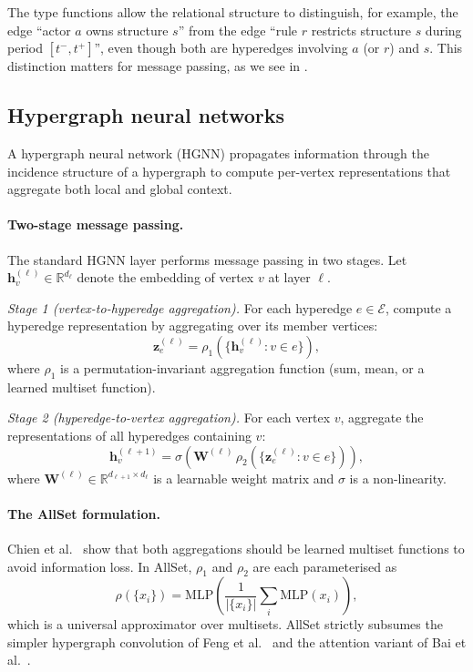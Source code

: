 \documentclass[11pt,a4paper]{article}
\theoremstyle{plain}
\theoremstyle{definition}
\theoremstyle{remark}
\newcommand{\hvec}{\mathbf{h}}
\begin{document}
The type functions allow the relational structure to distinguish, for
example, the edge ``actor $a$ owns structure $s$'' from the edge
``rule $r$ restricts structure $s$ during period $[t^-, t^+]$'',
even though both are hyperedges involving $a$ (or $r$) and $s$.
This distinction matters for message passing, as we see in
.

\subsection{Hypergraph neural networks}
\label{sec:prelim_hgnn}

A hypergraph neural network (HGNN) propagates information through
the incidence structure of a hypergraph to compute per-vertex
representations that aggregate both local and global context.

\paragraph{Two-stage message passing.}
The standard HGNN layer performs message passing in two stages.
Let $\hvec_v^{(\ell)} \in \mathbb{R}^{d_\ell}$ denote the embedding
of vertex $v$ at layer $\ell$.

\textit{Stage 1 (vertex-to-hyperedge aggregation).}
For each hyperedge $e \in \mathcal{E}$, compute a hyperedge
representation by aggregating over its member vertices:
\[
  \mathbf{z}_e^{(\ell)}
  = \rho_1\!\left(\bigl\{\hvec_v^{(\ell)} : v \in e\bigr\}\right),
\]
where $\rho_1$ is a permutation-invariant aggregation function (sum,
mean, or a learned multiset function).

\textit{Stage 2 (hyperedge-to-vertex aggregation).}
For each vertex $v$, aggregate the representations of all hyperedges
containing $v$:
\[
  \hvec_v^{(\ell+1)}
  = \sigma\!\left(\mathbf{W}^{(\ell)}\,
    \rho_2\!\left(\bigl\{\mathbf{z}_e^{(\ell)} : v \in e\bigr\}\right)
  \right),
\]
where $\mathbf{W}^{(\ell)} \in \mathbb{R}^{d_{\ell+1} \times d_\ell}$
is a learnable weight matrix and $\sigma$ is a non-linearity.

\paragraph{The AllSet formulation.}
Chien et al.~\cite{chien2022allset} show that both aggregations should
be learned multiset functions to avoid information loss. In AllSet,
$\rho_1$ and $\rho_2$ are each parameterised as
\[
  \rho(\{x_i\}) = \text{MLP}\!\left(\frac{1}{|\{x_i\}|}\sum_i
    \text{MLP}(x_i)\right),
\]
which is a universal approximator over multisets. AllSet strictly
subsumes the simpler hypergraph convolution of Feng
et al.~\cite{feng2019hgnn} and the attention variant of Bai
et al.~\cite{bai2021hypergraph}.
\end{document}

